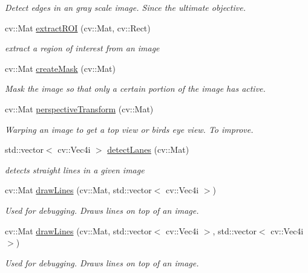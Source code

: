 \begin{DoxyCompactItemize}
\begin{DoxyCompactList}\small\item\em Detect edges in an gray scale image. Since the ultimate objective. \end{DoxyCompactList}\item 
cv\+::\+Mat \hyperlink{classlanedetector_ab82eab5e0a1d126018c99875b2486d5e}{extract\+R\+OI} (cv\+::\+Mat, cv\+::\+Rect)
\begin{DoxyCompactList}\small\item\em extract a region of interest from an image \end{DoxyCompactList}\item 
cv\+::\+Mat \hyperlink{classlanedetector_abea27c43dbcf8444f5c2b23dd6e4bb6d}{create\+Mask} (cv\+::\+Mat)
\begin{DoxyCompactList}\small\item\em Mask the image so that only a certain portion of the image has active. \end{DoxyCompactList}\item 
cv\+::\+Mat \hyperlink{classlanedetector_a6433369cb584d5c247fe1a00569d17d5}{perspective\+Transform} (cv\+::\+Mat)
\begin{DoxyCompactList}\small\item\em Warping an image to get a top view or bird\textquotesingle{}s eye view. To improve. \end{DoxyCompactList}\item 
std\+::vector$<$ cv\+::\+Vec4i $>$ \hyperlink{classlanedetector_a10d588d6b85384ad237e6fbfdf679591}{detect\+Lanes} (cv\+::\+Mat)
\begin{DoxyCompactList}\small\item\em detects straight lines in a given image \end{DoxyCompactList}\item 
cv\+::\+Mat \hyperlink{classlanedetector_a7d7506555f481f184276a4180c200a73}{draw\+Lines} (cv\+::\+Mat, std\+::vector$<$ cv\+::\+Vec4i $>$)
\begin{DoxyCompactList}\small\item\em Used for debugging. Draws lines on top of an image. \end{DoxyCompactList}\item 
cv\+::\+Mat \hyperlink{classlanedetector_a714784d2ef657578c3b8bbef5aeb3dd4}{draw\+Lines} (cv\+::\+Mat, std\+::vector$<$ cv\+::\+Vec4i $>$, std\+::vector$<$ cv\+::\+Vec4i $>$)
\begin{DoxyCompactList}\small\item\em Used for debugging. Draws lines on top of an image. \end{DoxyCompactList}\item 

\end{DoxyCompactItemize}
